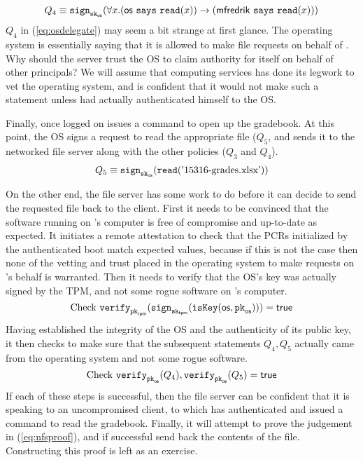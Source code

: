 \documentclass[11pt,twoside]{scrartcl}
\begin{document}
\begin{equation}
\label{eq:osdelegate}
Q_4 \equiv \sign{\sk{\os}}{\forall x . (\says{\os}{\readf{x}}) \limply (\says{\matt}{\readf{x}})}
\end{equation}
$Q_4$ in (\ref{eq:osdelegate}) may seem a bit strange at first glance. The operating system is essentially saying that it is allowed to make file requests on behalf of \matt. Why should the server trust the OS to claim authority for itself on behalf of other principals? We will assume that computing services has done its legwork to vet the operating system, and is confident that it would not make such a statement unless \matt had actually authenticated himself to the OS.

Finally, once logged on \matt issues a command to open up the gradebook. At this point, the OS signs a request to read the appropriate file ($Q_5$, and sends it to the networked file server along with the other policies ($Q_3$ and $Q_4$).
\begin{align}
Q_5 \equiv \texttt{\upshape sign}_{\texttt{\upshape sk}_{\mathsf{os}}}(\texttt{\upshape read}(\text{'15316-grades.xlsx'}))
\end{align}

On the other end, the file server has some work to do before it can decide to send the requested file back to the client. First it needs to be convinced that the software running on \matt's computer is free of compromise and up-to-date as expected. It initiates a remote attestation to check that the PCRs initialized by the authenticated boot match expected values, because if this is not the case then none of the vetting and trust placed in the operating system to make requests on \matt's behalf is warranted. Then it needs to verify that the OS's key was actually signed by the TPM, and not some rogue software on \matt's computer.
\begin{equation}
\text{Check}~\texttt{\upshape verify}_{\texttt{\upshape pk}_{\mathsf{tpm}}}(\texttt{\upshape sign}_{\texttt{\upshape sk}_{\mathsf{tpm}}}(\texttt{\upshape isKey}(\mathsf{os},\texttt{\upshape pk}_{\mathsf{os}}))) = \mathsf{true}
\end{equation}
Having established the integrity of the OS and the authenticity of its public key, it then checks to make sure that the subsequent statements $Q_4,Q_5$ actually came from the operating system and not some rogue software.
\begin{equation}
\text{Check}~\texttt{\upshape verify}_{\texttt{\upshape pk}_{\mathsf{os}}}(Q_4),\texttt{\upshape verify}_{\texttt{\upshape pk}_{\mathsf{os}}}(Q_5) = \mathsf{true}
\end{equation}
If each of these steps is successful, then the file server can be confident that it is speaking to an uncompromised client, to which \matt has authenticated and issued a command to read the gradebook. Finally, it will attempt to prove the judgement in (\ref{eq:nfsproof}), and if successful send back the contents of the file. Constructing this proof is left as an exercise.


\end{document}
